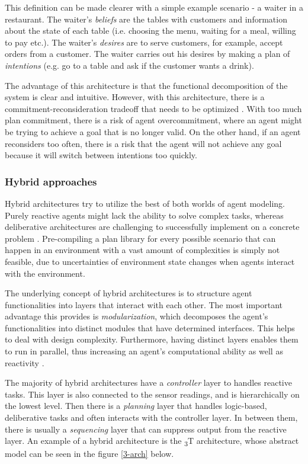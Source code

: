 \documentclass[0main.tex]{subfiles}
\begin{document}
This definition can be made clearer with a simple example scenario - a waiter in a restaurant.
The waiter's \emph{beliefs} are the tables with customers and information about the state of each
table (i.e. choosing the menu, waiting for a meal, willing to pay etc.). The waiter's \emph{desires}
are to serve customers, for example, accept orders from a customer. The waiter carries out his
desires by making a plan of \emph{intentions} (e.g. go to a table and ask if the customer wants a
drink).

The advantage of this architecture is that the functional decomposition of the system
is clear and intuitive. However, with this architecture, there is a commitment-reconsideration
tradeoff that needs to be optimized \cite{Wooldridge1999}. With too much plan commitment, there is a
risk of agent overcommitment, where an agent might be trying to achieve a goal that is no
longer valid. On the other hand, if an agent reconsiders too often, there is a risk that the
agent will not achieve any goal because it will switch between intentions too quickly.

\subsubsection{Hybrid approaches}\label{hybrid-arch}

Hybrid architectures try to utilize the best of both worlds of agent modeling. Purely reactive 
agents might lack the ability to solve complex tasks, whereas deliberative architectures are 
challenging to successfully implement on a concrete problem \cite{Anthony2014}. Pre-compiling a plan
library for every possible scenario that can happen in an environment with a vast amount of complexities
is simply not feasible, due to uncertainties of environment state changes when agents 
interact with the environment. 

The underlying concept of hybrid architectures is to structure agent functionalities into layers 
that interact with each other. The most important advantage this provides is \emph{modularization},
which decomposes the agent's functionalities into distinct modules that have determined 
interfaces. This helps to deal with design complexity. Furthermore, having distinct layers enables 
them to run in parallel, thus increasing an agent's computational ability as well as reactivity
\cite{Mueller1999}.

The majority of hybrid architectures have a \emph{controller} layer to handles reactive tasks.
This layer is also connected to the sensor readings, and is hierarchically on the lowest level.
Then there is a \emph{planning} layer that handles logic-based, deliberative tasks and
often interacts with the controller layer. In between them, there is usually a \emph{sequencing}
layer that can suppress output from the reactive layer. An example of a hybrid architecture is
the \textsubscript{3}T architecture, whose abstract model can be seen in the figure
\ref{3-arch} below.
\end{document}
